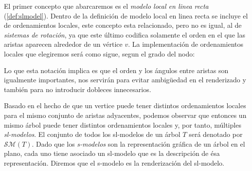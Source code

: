 El primer concepto que abarcaremos es el \textit{modelo local en linea recta} (\ref{def:slmodel}). Dentro de la definición de modelo local en linea recta se incluye el de ordenamientos locales, este concepto esta relacionado, pero no es igual, al de \textit{sistemas de rotaci\'on}, ya que este \'ultimo codifica solamente el orden en el que las aristas aparecen alrededor de un v\'ertice $v$. La implementación de ordenamientos locales que elegiremos será como sigue, segun el grado del nodo:


Lo que esta notación implica es que el orden y los ángulos entre aristas son igualmente importantes, nos servirán para evitar ambigüedad en el renderizado y también para no introducir dobleces innecesarios.

Basado en el hecho de que un vertice puede tener distintos ordenamientos locales para el mismo conjunto de aristas adyacentes, podemos observar que entonces un mismo árbol puede tener distintos ordenamientos locales y, por tanto, múltiples \textit{sl-modelos}. El conjunto de todos los sl-modelos de un árbol $T$ será denotado por $(T)$. Dado que los \textit{s-modelos} son la representación gráfica de un árbol en el plano, cada uno tiene asociado un sl-modelo que es la descripción de ésa representación. Diremos que el s-modelo es la renderización del sl-modelo.

